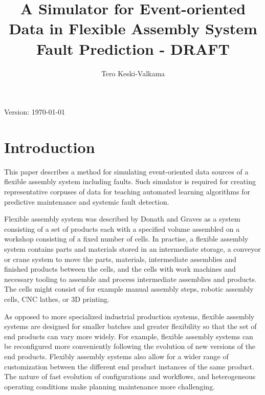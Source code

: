 \documentclass[journal]{IEEEtran}
\title{A Simulator for Event-oriented Data in Flexible Assembly System Fault Prediction - DRAFT}
\author{Tero Keski-Valkama}
\begin{document}
\maketitle
Version: \today

\begin{abstract}

\end{abstract}

\begin{IEEEkeywords}
\end{IEEEkeywords}

\section{Introduction}
This paper describes a method for simulating event-oriented data sources of a flexible assembly system including faults. Such simulator is required for creating representative corpuses
of data for teaching automated learning algorithms for predictive maintenance and systemic fault detection.

Flexible assembly system was described by Donath and Graves \cite{donath1988flexible} as a system consisting of a set of products each with a specified volume
assembled on a workshop consisting of a fixed number of cells. In practise, a flexible assembly system contains parts and materials stored in an intermediate storage,
a conveyor or crane system to move the parts, materials, intermediate assemblies and finished products between the cells, and the cells with work machines and necessary tooling
to assemble and process intermediate assemblies and products. The cells might consist of for example manual assembly steps, robotic assembly cells, CNC lathes, or 3D printing.

As opposed to more specialized industrial production systems, flexible assembly systems are designed for smaller batches and greater flexibility so that the set of end products can vary more widely.
For example, flexible assembly systems can be reconfigured more conveniently following the evolution of new versions of the end products. Flexibly assembly systems also allow for a wider range
of customization between the different end product instances of the same product. The nature of fast evolution of configurations and workflows, and heterogeneous operating conditions make
planning maintenance more challenging.
\end{document}
